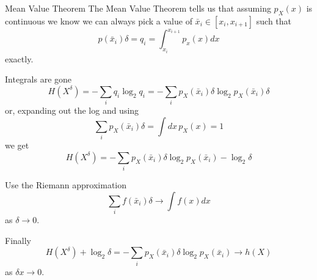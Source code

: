 \documentclass{beamer}
\newcommand{\crish}{\color{reddish}}
\newcommand{\cbla}{\color{black}}
\begin{document}
\begin{frame}{Mean Value Theorem}
  The Mean Value Theorem tells us that assuming \crish$p_X(x)$\cbla{} is continuous we know we can
always pick a value of \crish$\bar{x}_i\in[x_i,x_{i+1}]$\cbla{} such that\crish
$$
  p(\bar{x}_i)\delta =q_i=\int_{x_i}^{x_{i+1}}p_x(x)dx
  $$
  \cbla
exactly.
\end{frame}

\begin{frame}{Integrals are gone}
  \crish
  $$H(X^\delta)=-\sum_i q_i \log_2{q_i} = -\sum_i  p_X(\bar{x}_i)\delta\log_2{p_X(\bar{x}_i)\delta}$$
    \cbla
    or, expanding out the log and using
    \crish
    $$
  \sum_ip_X(\bar{x}_i)\delta  = \int dx\, p_X(x)=1     
$$\cbla
    we get
  \crish
  $$H(X^\delta) = -\sum_i  p_X(\bar{x}_i)\delta\log_2{p_X(\bar{x}_i)}-\log_2{\delta}$$
    \cbla
\end{frame}

\begin{frame}{Use the Riemann approximation}
  \crish
$$
  \sum_i f(\bar{x}_i) \delta \rightarrow \int f(x)dx 
$$\cbla
as \crish $\delta \rightarrow 0$\cbla{}.
\end{frame}

\begin{frame}{Finally}
\crish
  $$H(X^\delta)+\log_2{\delta} = -\sum_i  p_X(\bar{x}_i)\delta\log_2{p_X(\bar{x}_i)}\rightarrow h(X)$$
    \cbla
    as \crish$\delta x\rightarrow 0$\cbla.
\end{frame}
\end{document}
